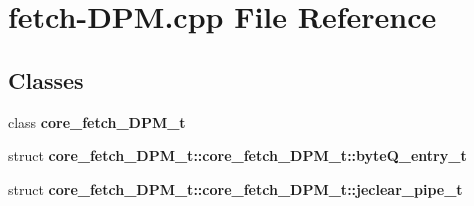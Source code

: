 \section{fetch-DPM.cpp File Reference}
\label{fetch-DPM_8cpp}
\subsection*{Classes}
\begin{CompactItemize}
\item 
class {\bf core\_\-fetch\_\-DPM\_\-t}
\item 
struct {\bf core\_\-fetch\_\-DPM\_\-t::core\_\-fetch\_\-DPM\_\-t::byteQ\_\-entry\_\-t}
\item 
struct {\bf core\_\-fetch\_\-DPM\_\-t::core\_\-fetch\_\-DPM\_\-t::jeclear\_\-pipe\_\-t}
\end{CompactItemize}
